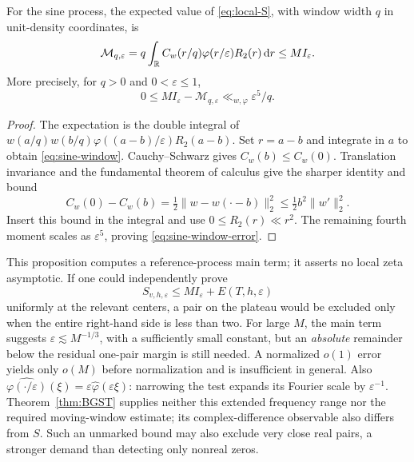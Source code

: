 \begin{proposition}\label{prop:sine-window}
For the sine process, the expected value of \eqref{eq:local-S}, with
window width \(q\) in unit-density coordinates, is
\begin{equation}\label{eq:sine-window}
 \mathcal M_{q,\varepsilon}
 =q\int_\mathbb R C_w(r/q)\varphi(r/\varepsilon)R_2(r)\,\mathrm d r
 \le M I_\varepsilon.
\end{equation}
More precisely, for \(q>0\) and \(0<\varepsilon\le1\),
\begin{equation}\label{eq:sine-window-error}
 0\le M I_\varepsilon-\mathcal M_{q,\varepsilon}
       \ll_{w,\varphi}\varepsilon^5/q.
\end{equation}
\end{proposition}
\begin{proof}
The expectation is the double integral of
\(w(a/q)w(b/q)\varphi((a-b)/\varepsilon)R_2(a-b)\).
Set \(r=a-b\) and integrate in \(a\) to obtain
\eqref{eq:sine-window}. Cauchy--Schwarz gives
\(C_w(b)\le C_w(0)\). Translation invariance and the fundamental
theorem of calculus give the sharper identity and bound
\[
 C_w(0)-C_w(b)=\tfrac12\|w-w(\cdot-b)\|_2^2
                       \le\tfrac12 b^2\|w'\|_2^2.
\]
Insert this bound in the integral and use \(0\le R_2(r)\ll r^2\).
The remaining fourth moment scales as \(\varepsilon^5\), proving
\eqref{eq:sine-window-error}.
\end{proof}

This proposition computes a reference-process main term; it asserts
no local zeta asymptotic. If one could independently prove
\begin{equation}\label{eq:coincidence-target}
 S_{v,h,\varepsilon}\le M I_\varepsilon+E(T,h,\varepsilon)
\end{equation}
uniformly at the relevant centers, a pair on the plateau would be
excluded only when the entire right-hand side is less than two.
For large \(M\), the main term suggests
\(\varepsilon\lesssim M^{-1/3}\), with a sufficiently small constant,
but an \emph{absolute} remainder below the residual one-pair margin
is still needed. A normalized \(o(1)\) error yields only \(o(M)\)
before normalization and is insufficient in general.
Also \(\widehat{\varphi(\cdot/\varepsilon)}(\xi)
=\varepsilon\widehat\varphi(\varepsilon\xi)\): narrowing the
test expands its Fourier scale by \(\varepsilon^{-1}\).
Theorem~\ref{thm:BGST} supplies neither this extended frequency range
nor the required moving-window estimate; its complex-difference
observable also differs from \(S\). Such an unmarked bound may
also exclude very close real pairs, a stronger demand than detecting
only nonreal zeros.

